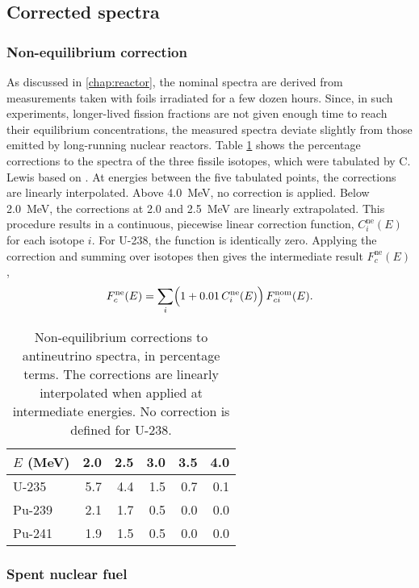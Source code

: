 \documentclass[../thesis.tex]{subfiles}
\begin{document}
\subsection{Corrected spectra}
\label{sec:corrspectra}

\subsubsection{Non-equilibrium correction}
\label{sec:noneqcorrspectra}

As discussed in \ref{chap:reactor}, the nominal spectra are derived from
measurements taken with foils irradiated for a few dozen hours. Since, in such
experiments, longer-lived fission fractions are not given enough time to reach
their equilibrium concentrations, the measured spectra deviate slightly from
those emitted by long-running nuclear reactors. Table \ref{tab:noneqcorr} shows
the percentage corrections to the spectra of the three fissile isotopes, which
were tabulated by C. Lewis \cite{Lewis} based on \cite{French}. At energies
between the five tabulated points, the corrections are linearly interpolated.
Above 4.0~MeV, no correction is applied. Below 2.0~MeV, the corrections at 2.0
and 2.5~MeV are linearly extrapolated. This procedure results in a continuous,
piecewise linear correction function, $C^\mathrm{ne}_i(E)$ for each isotope $i$.
For U-238, the function is identically zero. Applying the correction and summing
over isotopes then gives the intermediate result $F^\mathrm{ne}_c(E)$,
\[ F^\mathrm{ne}_c(E) = \sum_i \Bigl(1 + 0.01\, C^\mathrm{ne}_i(E)\Bigr)\,
  F^\mathrm{nom}_{ci}(E). \]

\begin{table}
  \centering
  \begin{tabular}{lrrrrr}
    \toprule
    $E$ (MeV) & 2.0 & 2.5 & 3.0 & 3.5 & 4.0 \\
    \midrule
    U-235 & 5.7 & 4.4 & 1.5 & 0.7 & 0.1 \\
    Pu-239 & 2.1 & 1.7 & 0.5 & 0.0 & 0.0 \\
    Pu-241 & 1.9 & 1.5 & 0.5 & 0.0 & 0.0 \\
    \bottomrule
  \end{tabular}
  \caption{Non-equilibrium corrections to antineutrino spectra, in percentage
    terms. The corrections are linearly interpolated when applied at
    intermediate energies. No correction is defined for U-238.}
  \label{tab:noneqcorr}
\end{table}

\subsubsection{Spent nuclear fuel}
\label{sec:snfcorrspectra}
\end{document}
